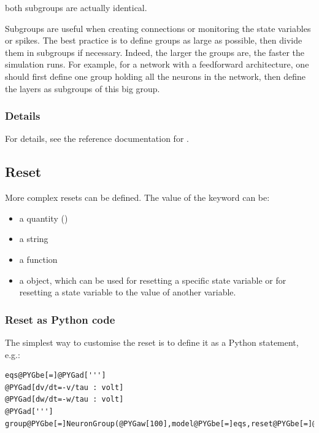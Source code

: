 \documentclass[letterpaper,10pt,english]{manual}
\begin{document}
both subgroups are actually identical.

Subgroups are useful when creating connections or monitoring the state variables or spikes.
The best practice is to define groups as large as possible, then divide them in subgroups if necessary.
Indeed, the larger the groups are, the faster the simulation runs. For example, for a network with a feedforward
architecture, one should first define one group holding all the neurons in the network, then define the layers as
subgroups of this big group.


\subsubsection{Details}

For details, see the reference documentation for \hyperlink{brian.NeuronGroup}{}.


\subsection{Reset}

More complex resets can be defined. The value of the  keyword can be:
\begin{itemize}
\item {} 
a quantity ()

\item {} 
a string

\item {} 
a function

\item {} 
a \hyperlink{brian.Reset}{} object, which can be used for resetting a specific state variable or
for resetting a state variable to the value of another variable.

\end{itemize}


\subsubsection{Reset as Python code}

The simplest way to customise the reset is to define it as a Python statement, e.g.:

\begin{Verbatim}[commandchars=@\[\]]
eqs@PYGbe[=]@PYGad[''']
@PYGad[dv/dt=-v/tau : volt]
@PYGad[dw/dt=-w/tau : volt]
@PYGad[''']
group@PYGbe[=]NeuronGroup(@PYGaw[100],model@PYGbe[=]eqs,reset@PYGbe[=]@PYGad["]@PYGad[v=0*mV;w+=3*mV]@PYGad["],threshold@PYGbe[=]@PYGaw[10]@PYGbe[*]mV)
\end{Verbatim}
\end{document}
